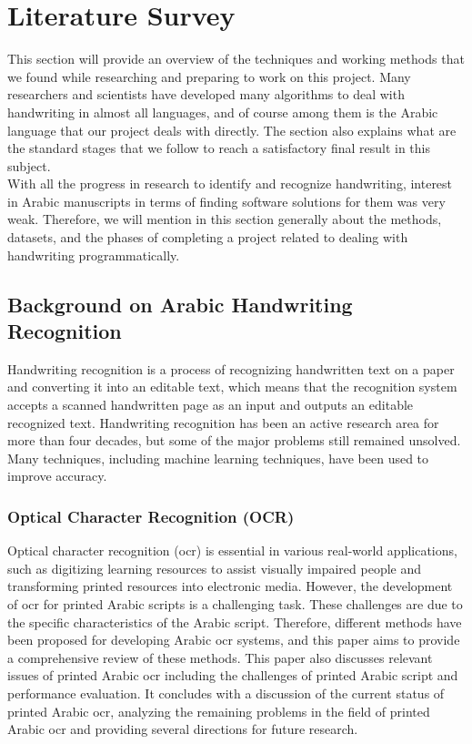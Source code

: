 \chapter{Literature Survey}
\label{ch:literature-survey}

\quad This section will provide an overview of the techniques and working methods that we found while researching and preparing to work on this project. Many researchers and scientists have developed many algorithms to deal with handwriting in almost all languages, and of course among them is the Arabic language that our project deals with directly. The section also explains what are the standard stages that we follow to reach a satisfactory final result in this subject. \\

With all the progress in research to identify and recognize handwriting, interest in Arabic manuscripts in terms of finding software solutions for them was very weak. Therefore, we will mention in this section generally about the methods, datasets, and the phases of completing a project related to dealing with handwriting programmatically.


\section{Background on Arabic Handwriting Recognition}
Handwriting recognition is a process of recognizing handwritten text on a paper and converting it into an editable text, which means that the recognition system accepts a scanned handwritten page as an input and outputs an editable recognized text. Handwriting recognition has been an active research area for more than four decades, but some of the major problems still remained unsolved. Many techniques, including machine learning techniques, have been used to improve accuracy.

\subsection{Optical Character Recognition (OCR)}
Optical character recognition (\acrshort{ocr}) is essential in various real-world applications, such as digitizing learning resources to assist visually impaired people and transforming printed resources into electronic media. However, the development of \acrshort{ocr} for printed Arabic scripts is a challenging task. These challenges are due to the specific characteristics of the Arabic script. Therefore, different methods have been proposed for developing Arabic \acrshort{ocr} systems, and this paper \cite{Alghamdi2018} aims to provide a comprehensive review of these methods. This paper also discusses relevant issues of printed Arabic \acrshort{ocr} including the challenges of printed Arabic script and performance evaluation. It concludes with a discussion of the current status of printed Arabic \acrshort{ocr}, analyzing the remaining problems in the field of printed Arabic \acrshort{ocr} and providing several directions for future research. \\

